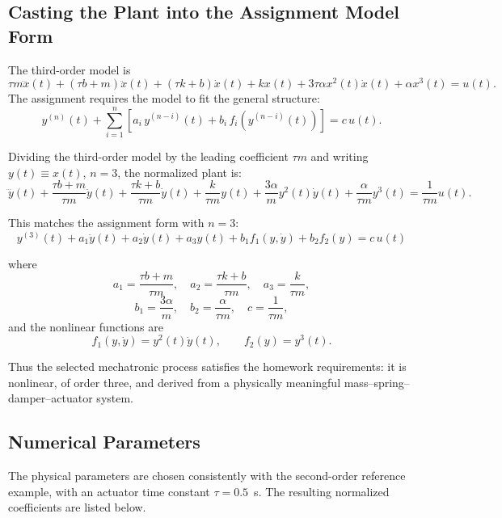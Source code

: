 \documentclass[12pt]{article}
\begin{document}
\subsection{Casting the Plant into the Assignment Model Form}
\noindent The third-order model is
\[
\tau m\dddot{x}(t)+(\tau b+m)\ddot{x}(t)+(\tau k+b)\dot{x}(t)+kx(t)+3\tau\alpha x^2(t)\dot{x}(t)+\alpha x^3(t)=u(t).
\]
\noindent The assignment requires the model to fit the general structure:
\[
y^{(n)}(t) + \sum_{i=1}^{n}\left[a_i\,y^{(n-i)}(t) + b_i\,f_i\!\left(y^{(n-i)}(t)\right)\right] = c\,u(t).
\]

\noindent Dividing the third-order model by the leading coefficient \(\tau m\) and writing \(y(t) \equiv x(t)\), \(n = 3\), the normalized plant is:
\[
\dddot{y}(t)
+
\frac{\tau b+m}{\tau m}\ddot{y}(t)
+
\frac{\tau k+b}{\tau m}\dot{y}(t)
+
\frac{k}{\tau m}y(t)
+
\frac{3\alpha}{m}y^2(t)\dot{y}(t)
+
\frac{\alpha}{\tau m}y^3(t)
=
\frac{1}{\tau m}u(t).
\]

\noindent This matches the assignment form with \(n=3\):
\[
\boxed{
y^{(3)}(t)
+
a_1 \ddot{y}(t)
+
a_2 \dot{y}(t)
+
a_3 y(t)
+
b_1 f_1(y,\dot{y})
+
b_2 f_2(y)
=
c\,u(t)
}
\]

\noindent where
\[
a_1=\frac{\tau b+m}{\tau m}, \quad
a_2=\frac{\tau k+b}{\tau m}, \quad
a_3=\frac{k}{\tau m},
\]
\[
b_1=\frac{3\alpha}{m}, \quad
b_2=\frac{\alpha}{\tau m},  \quad
c=\frac{1}{\tau m},
\]
\noindent and the nonlinear functions are
\[
f_1(y,\dot{y})=y^2(t)\dot{y}(t),
\qquad
f_2(y)=y^3(t).
\]

\noindent Thus the selected mechatronic process satisfies the homework requirements: it is nonlinear, of order three, and derived from a physically meaningful mass--spring--damper--actuator system.

\subsection{Numerical Parameters}

\noindent The physical parameters are chosen consistently with the
second-order reference example, with an actuator time constant
\(\tau = 0.5\)~s. The resulting normalized coefficients are listed below.
\end{document}
